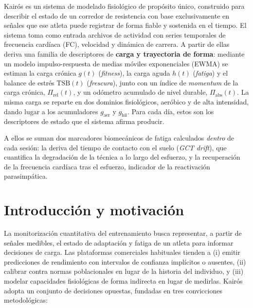 \documentclass[11pt,a4paper]{article}
\begin{document}
Kairós es un sistema de modelado fisiológico de propósito único, construido para describir el estado de un corredor de resistencia con base exclusivamente en señales que ese atleta puede registrar de forma fiable y sostenida en el tiempo. El sistema toma como entrada archivos de actividad con series temporales de frecuencia cardíaca (FC), velocidad y dinámica de carrera. A partir de ellas deriva una familia de descriptores de \textbf{carga y trayectoria de forma}: mediante un modelo impulso-respuesta de medias móviles exponenciales (EWMA) se estiman la carga crónica $g(t)$ (\emph{fitness}), la carga aguda $h(t)$ (\emph{fatiga}) y el balance de estrés $\mathrm{TSB}(t)$ (\emph{frescura}), junto con un índice de \emph{momentum} de la carga crónica, $\Pi_{\mathrm{rel}}(t)$, y un odómetro acumulado de nivel durable, $\Pi_{\mathrm{abs}}(t)$. La misma carga se reparte en dos dominios fisiológicos, aeróbico y de alta intensidad, dando lugar a los acumuladores $g_{\mathrm{aer}}$ y $g_{\mathrm{hii}}$. Para cada día, estos son los descriptores de estado que el sistema afirma producir.

A ellos se suman dos marcadores biomecánicos de fatiga calculados \emph{dentro} de cada sesión: la deriva del tiempo de contacto con el suelo (\emph{GCT drift}), que cuantifica la degradación de la técnica a lo largo del esfuerzo, y la recuperación de la frecuencia cardíaca tras el esfuerzo, indicador de la reactivación parasimpática.

\section{Introducción y motivación}
\label{sec:motivacion}

La monitorización cuantitativa del entrenamiento busca representar, a partir de señales medibles, el estado de adaptación y fatiga de un atleta para informar decisiones de carga. Las plataformas comerciales habituales tienden a (i) emitir predicciones de rendimiento con intervalos de confianza implícitos o ausentes, (ii) calibrar contra normas poblacionales en lugar de la historia del individuo, y (iii) modelar capacidades fisiológicas de forma indirecta en lugar de medirlas. Kairós adopta un conjunto de decisiones opuestas, fundadas en tres convicciones metodológicas:
\end{document}
